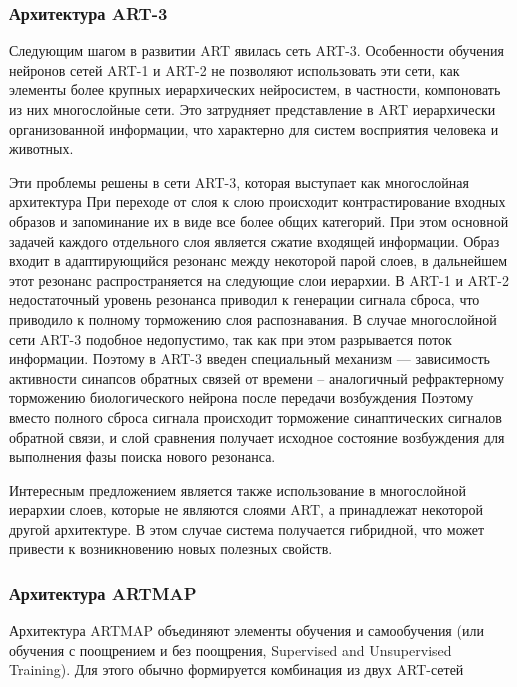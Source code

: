 \documentclass[14pt,a4paper,report]{article}
\begin{document}
\subsubsection{Архитектура ART-3}

Следующим шагом в развитии ART явилась сеть ART-3. Особенности обучения нейронов сетей ART-1 и ART-2 не позволяют использовать эти сети, как элементы более крупных иерархических нейросистем, в частности, компоновать из них многослойные сети. Это затрудняет представление в ART иерархически организованной информации, что характерно для систем восприятия человека и животных.

Эти проблемы решены в сети ART-3, которая выступает как многослойная архитектура \cite{cite-lek-narod} При переходе от слоя к слою происходит контрастирование входных образов и запоминание их в виде все более общих категорий. При этом основной задачей каждого отдельного слоя является сжатие входящей информации. Образ входит в адаптирующийся резонанс между некоторой парой слоев, в дальнейшем этот резонанс распространяется на следующие слои иерархии. В ART-1 и ART-2 недостаточный уровень резонанса приводил к генерации сигнала сброса, что приводило к полному торможению слоя распознавания. В случае многослойной сети ART-3 подобное недопустимо, так как при этом разрывается поток информации. Поэтому в ART-3 введен специальный механизм — зависимость активности синапсов обратных связей от времени -- аналогичный рефрактерному торможению биологического нейрона после передачи возбуждения \cite{cite-kgeu-adapt} Поэтому вместо полного сброса сигнала происходит торможение синаптических сигналов обратной связи, и слой сравнения получает исходное состояние возбуждения для выполнения фазы поиска нового резонанса. 

Интересным предложением является также использование в многослойной иерархии слоев, которые не являются слоями ART, а принадлежат некоторой другой архитектуре. В этом случае система получается гибридной, что может привести к возникновению новых полезных свойств.

\subsubsection{Архитектура ARTMAP}

Архитектура ARTMAP объединяют элементы обучения и самообучения (или обучения с поощрением и без поощрения, Supervised and Unsupervised Training). Для этого обычно формируется комбинация из двух ART-сетей \cite{cite-window-adapt}
\end{document}
